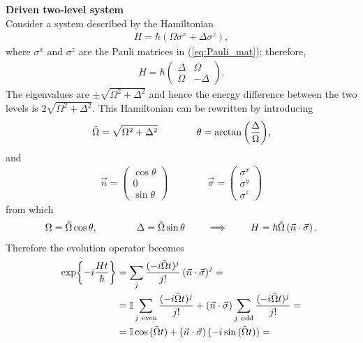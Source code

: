 \begin{tcolorbox}
\textbf{Driven two-level system} \\
Consider a system described by the Hamiltonian 
\begin{align*}
    H = \hbar \left( \Omega \sigma^x + \Delta \sigma^z \right),
\end{align*}
where $\sigma^x$ and $\sigma^z$ are the Pauli matrices in (\ref{eq:Pauli_mat}); therefore, 
\begin{align*}
    H = \hbar \begin{pmatrix} \Delta & \Omega \\ \Omega & -\Delta \end{pmatrix}.
\end{align*}
The eigenvalues are $\pm \sqrt{\Omega^2 + \Delta^2}$ and hence the energy difference between the two levels is $2 \sqrt{\Omega^2 + \Delta^2}$. This Hamiltonian can be rewritten by introducing 
\begin{align*}
    \Tilde{\Omega} = \sqrt{\Omega^2 + \Delta^2} \qquad \qquad \theta = \arctan{\left( \frac{\Delta}{\Omega} \right)}, 
\end{align*}
and 
\begin{align*}
    \Vec{n} = \begin{pmatrix} \cos{\theta} \\ 0 \\ \sin{\theta} \end{pmatrix} \qquad \qquad 
    \Vec{\sigma} = \begin{pmatrix} \sigma^x \\ \sigma^y \\ \sigma^z \end{pmatrix}
\end{align*}
from which 
\begin{align*}
    \Omega = \Tilde{\Omega} \cos{\theta}, \qquad \qquad \Delta = \Tilde{\Omega} \sin{\theta} \qquad \implies \qquad H = \hbar \Tilde{\Omega} \left( \Vec{n} \cdot \Vec{\sigma} \right). 
\end{align*}
Therefore the evolution operator becomes 
\begin{align*}
    \exp{ -i\frac{Ht}{\hbar}} &= \sum_j \frac{(-i \Tilde{\Omega} t)^j}{j!} \left( \Vec{n} \cdot \Vec{\sigma} \right)^j = \\
    &= \mathbb{I} \sum_{j ~ \text{even}} \frac{(-i \Tilde{\Omega} t)^j}{j!} + \left( \Vec{n} \cdot \Vec{\sigma} \right) \sum_{j ~\text{odd}} \frac{(-i \Tilde{\Omega} t)^j}{j!} = \\
    &= \mathbb{I} \cos{(\Tilde{\Omega}t)} + \left( \Vec{n} \cdot \Vec{\sigma} \right) (-i \sin{(\Tilde{\Omega}t)}) = \\

\end{align*}
\end{tcolorbox}
